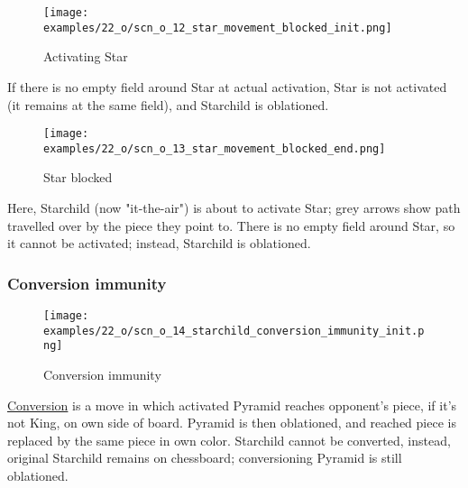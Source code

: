 \noindent
\begin{wrapfigure}[4]{l}{0.4\textwidth}
\centering
\texttt{[image: examples/22\_o/scn\_o\_12\_star\_movement\_blocked\_init.png]}
\caption{Activating Star}
\label{fig:scn_o_12_star_movement_blocked_init}
\end{wrapfigure}
If there is no empty field around Star at actual activation, Star is not activated
(it remains at the same field), and Starchild is oblationed.

\vspace*{4.1\baselineskip}
\noindent
\begin{wrapfigure}[7]{l}{0.4\textwidth}
\centering
\texttt{[image: examples/22\_o/scn\_o\_13\_star\_movement\_blocked\_end.png]}
\caption{Star blocked}
\label{fig:scn_o_13_star_movement_blocked_end}
\end{wrapfigure}
Here, Starchild (now "it-the-air") is about to activate Star; grey arrows show path
travelled over by the piece they point to. There is no empty field around Star, so it
cannot be activated; instead, Starchild is oblationed.

\clearpage %

\subsubsection*{Conversion immunity}
\label{sec:One/Starchild/Movement/Conversion immunity}

\vspace*{-1.4\baselineskip}
\noindent
\begin{figure}[!h]
\texttt{[image: examples/22\_o/scn\_o\_14\_starchild\_conversion\_immunity\_init.png]}
\caption{Conversion immunity}
\label{fig:scn_o_14_starchild_conversion_immunity_init}
\end{figure}

\hyperref[sec:Mayan Ascendancy/Pyramid/Conversion]{Conversion} is a move in which
activated Pyramid reaches opponent's piece, if it's not King, on own side of board.
Pyramid is then oblationed, and reached piece is replaced by the same piece in own
color. Starchild cannot be converted, instead, original Starchild remains on
chessboard; conversioning Pyramid is still oblationed.

